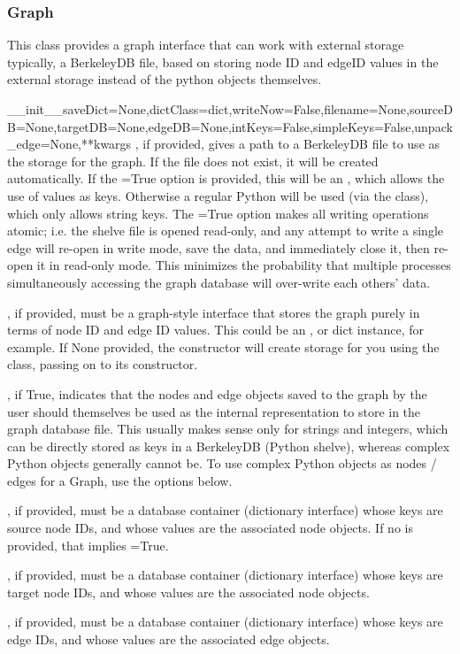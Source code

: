 \documentclass{howto}
\begin{document}
\subsubsection{Graph}
This class provides a graph interface that can work with external storage
typically, a BerkeleyDB file, based on storing node ID and
edgeID values in the external storage instead of the python objects themselves.
\begin{funcdesc}{__init__}{saveDict=None,dictClass=dict,writeNow=False,filename=None,sourceDB=None,targetDB=None,edgeDB=None,intKeys=False,simpleKeys=False,unpack_edge=None,**kwargs}
  , if provided, gives a path to a BerkeleyDB file to use as the 
  storage for the graph.  If the file does not exist, it will be created automatically.
  If the =True option is provided, this will be an ,
  which allows the use of  values as keys.  Otherwise a regular Python 
   will be used (via the  class),
  which only allows string keys.  The =True option makes all
  writing operations atomic; i.e. the shelve file is opened read-only, and
  any attempt to write a single edge will re-open in write mode, save the data,
  and immediately close it, then re-open it in read-only mode.  This minimizes
  the probability that multiple processes simultaneously accessing the graph
  database will over-write each others' data.

  , if provided, must be a graph-style interface that stores the graph
  purely in terms of node ID and edge ID values.  This could be an ,
   or dict instance, for example.  If None provided,
  the constructor will create storage for you using the  class, passing
  on  to its constructor.

  , if True, indicates that the nodes and edge objects saved to
  the graph by the user should themselves be used as the internal representation
  to store in the graph database file.  This usually makes sense only for strings
  and integers, which can be directly stored as keys in a BerkeleyDB (Python shelve),
  whereas complex Python objects generally cannot be.  To use complex Python objects
  as nodes / edges for a Graph, use the  options below.

  , if provided, must be a database container (dictionary interface) whose
  keys are source node IDs, and whose values are the associated node objects.
  If no  is provided, that implies =True.

  , if provided, must be a database container (dictionary interface) whose
  keys are target node IDs, and whose values are the associated node objects.

  , if provided, must be a database container (dictionary interface) whose
  keys are edge IDs, and whose values are the associated edge objects.
\end{funcdesc}
\end{document}
